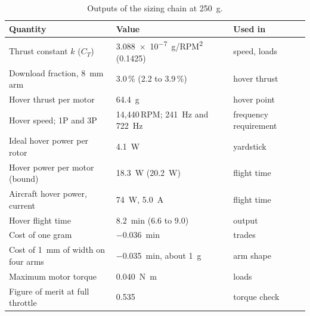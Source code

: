 \begin{table}[htbp]
\centering\small
\caption{Outputs of the sizing chain at \SI{250}{g}.}\label{tab:sizing-results}
\begin{tabular}{@{}lll@{}}
\toprule
Quantity & Value & Used in\\
\midrule
Thrust constant $k$ ($C_T$) & \SI{3.088e-7}{g/RPM^2} (0.1425) & speed, loads\\
Download fraction, \SI{8}{mm} arm & 3.0\,\% (2.2 to 3.9\,\%) & hover thrust\\
Hover thrust per motor & \SI{64.4}{g} & hover point\\
Hover speed; 1P and 3P & 14,440\,RPM; \SI{241}{Hz} and \SI{722}{Hz} & frequency requirement\\
Ideal hover power per rotor & \SI{4.1}{W} & yardstick\\
Hover power per motor (bound) & \SI{18.3}{W} (\SI{20.2}{W}) & flight time\\
Aircraft hover power, current & \SI{74}{W}, \SI{5.0}{A} & flight time\\
Hover flight time & \SI{8.2}{min} (6.6 to 9.0) & output\\
Cost of one gram & \SI{-0.036}{min} & trades\\
Cost of \SI{1}{mm} of width on four arms & \SI{-0.035}{min}, about \SI{1}{g} & arm shape\\
Maximum motor torque & \SI{0.040}{N.m} & loads\\
Figure of merit at full throttle & 0.535 & torque check\\
\bottomrule
\end{tabular}
\end{table}
